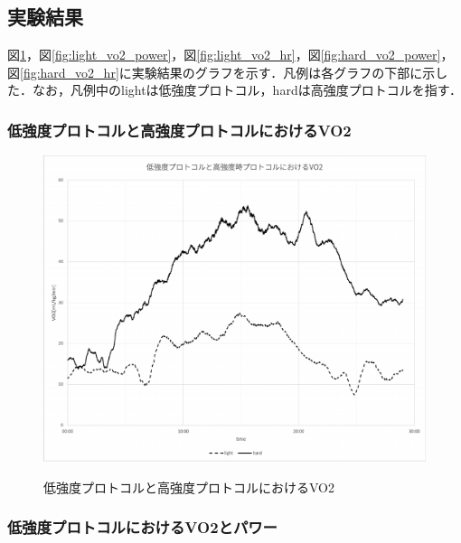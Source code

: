 \subsection{実験結果}

図\ref{fig:light_hard_vo2}，図\ref{fig:light_vo2_power}，図\ref{fig:light_vo2_hr}，図\ref{fig:hard_vo2_power}，図\ref{fig:hard_vo2_hr}に実験結果のグラフを示す．凡例は各グラフの下部に示した．なお，凡例中のlightは低強度プロトコル，hardは高強度プロトコルを指す．

\subsubsection{低強度プロトコルと高強度プロトコルにおけるVO2}

\begin{figure}[H]
  \begin{center}
    \label{fig:light_hard_vo2}
    \includegraphics[width=12cm]{fig/light_hard_vo2}
    \caption{低強度プロトコルと高強度プロトコルにおけるVO2}
  \end{center}
\end{figure}

\subsubsection{低強度プロトコルにおけるVO2とパワー}

